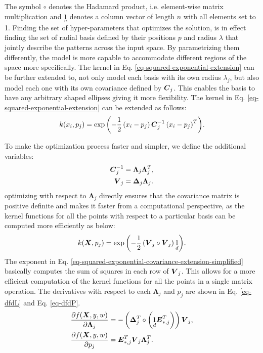 \documentclass[useAMS,usenatbib,fleqn]{mn2e}
\begin{document}
The symbol $\circ$ denotes the Hadamard product, i.e. element-wise matrix multiplication and $\underset{n}{1}$ denotes a column vector of length $n$ with all elements set to 1. Finding the set of hyper-parameters that optimizes the solution, is in effect finding the set of radial basis defined by their positions $p$ and radius $\lambda$ that jointly describe the patterns across the input space. By parametrizing them differently, the model is more capable to accommodate different regions of the space more specifically. The kernel in Eq. \eqref{eq-squared-exponential-extension} can be further extended to, not only model each basis with its own radius $\lambda_{j}$, but also model each one with its own covariance defined by $\bmath{C}_{j}$. This enables the basis to have any arbitrary shaped ellipses giving it more flexibility. The kernel in Eq. \eqref{eq-squared-exponential-extension} can be extended as follows:
\begin{equation}
\label{eq-squared-exponential-covariance-extension}
k(x_{i},p_{j}) = \exp{\left(-\frac{1}{2}\left(x_{i}-p_{j}\right)\bmath{C}_{j}^{-1}\left(x_{i}-p_{j}\right)^{T}\right)}.
\end{equation}

To make the optimization process faster and simpler, we define the additional variables:
\begin{subequations}
\begin{align}
\label{eq-Cinv}
\bmath{C}_{j}^{-1} &= \mathbf\Lambda_{j}\mathbf\Lambda_{j}^{T},\\
\label{eq-V_j}
\bmath{V}_{j} &= \mathbf\Delta_{j}\mathbf\Lambda_{j}.
\end{align}
\end{subequations}
optimizing with respect to $\mathbf\Lambda_{j}$ directly ensures that the covariance matrix is positive definite and makes it faster from a computational perspective, as the kernel functions for all the points with respect to a particular basis can be computed more efficiently as below:
\begin{equation}
\label{eq-squared-exponential-covariance-extension-simplified}
k(\bmath{X},p_{j}) = \exp{\left(-\frac{1}{2}\left(\bmath{V}_{j}\circ \bmath{V}_{j}\right)\underset{d}{1}\right)}.
\end{equation}
The exponent in Eq. \eqref{eq-squared-exponential-covariance-extension-simplified} basically computes the sum of squares in each row of $\bmath{V}_{j}$. This allows for a more efficient computation of the kernel functions for all the points in a single matrix operation. The derivatives with respect to each $\mathbf\Lambda_{j}$ and $p_{j}$ are shown in Eq. \eqref{eq-dfdL} and Eq. \eqref{eq-dfdP}.
\begin{subequations}
\begin{align}
\label{eq-dfdL}
\frac{\partial f(\bmath{X},y,w)}{\partial \mathbf\Lambda_{j}} &= -\left( \mathbf\Delta_{j}^{T}\circ \left(\underset{d}{1}\bmath{E}_{*,j}^{T}\right) \right)\bmath{V}_{j},\\
\label{eq-dfdP}
\frac{\partial f(\bmath{X},y,w)}{\partial p_{j}} &= \bmath{E}_{*,j}^{T}\bmath{V}_{j}\mathbf\Lambda_{j}^{T}.
\end{align}
\end{subequations}
\end{document}
